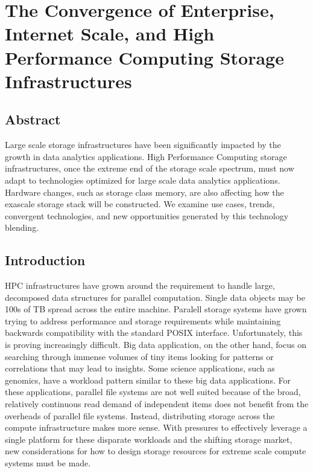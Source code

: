 
\chapter{The Convergence of Enterprise, Internet Scale, and High Performance
             Computing Storage Infrastructures}

\section*{Abstract}
Large scale storage infrastructures have been significantly impacted by the
growth in data analytics applications. High Performance Computing storage
infrastructures, once the extreme end of the storage scale spectrum, must now
adapt to technologies optimized for large scale data analytics applications.
Hardware changes, such as storage class memory, are also affecting how
the exascale storage stack will be constructed. We examine use cases, trends,
convergent technologies, and new opportunities generated by this technology
blending.

\section{Introduction}\label{sec:intro}
HPC infrastructures have grown around the requirement to handle large,
decomposed data structures for parallel computation. Single data objects may be
100s of TB spread across the entire machine. Paralell storage systems have
grown trying to address performance and storage requirements while maintaining
backwards compatibility with the standard POSIX interface.  Unfortunately, this
is proving increasingly difficult. Big data application, on the other hand,
focus on searching through immense volumes of tiny items looking for patterns
or correlations that may lead to insights.  Some science applications, such as
genomics, have a workload pattern similar to these big data applications. For
these applications, parallel file systems are not well suited because of the
broad, relatively continuous read demand of independent items does not benefit
from the overheads of parallel file systems. Instead, distributing storage
across the compute infrastructure makes more sense. With pressures to
effectively leverage a single platform for these disparate workloads and the
shifting storage market, new considerations for how to design storage resources
for extreme scale compute systems must be made.

